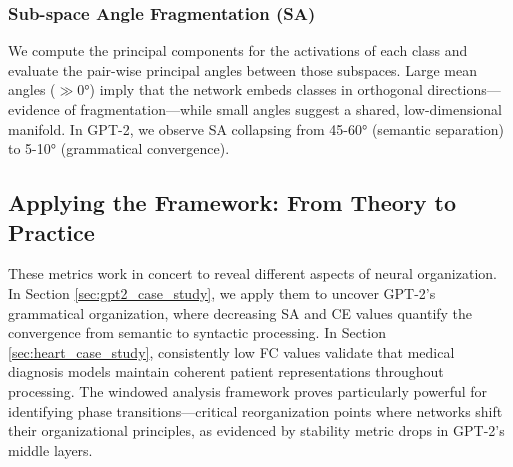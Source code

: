 \subsubsection{Sub-space Angle Fragmentation (SA)}
We compute the principal components for the activations of each class and evaluate the pair-wise principal angles between those subspaces. Large mean angles ($\gg 0°$) imply that the network embeds classes in orthogonal directions—evidence of fragmentation—while small angles suggest a shared, low-dimensional manifold. In GPT-2, we observe SA collapsing from 45-60° (semantic separation) to 5-10° (grammatical convergence).

\subsection{Applying the Framework: From Theory to Practice}

These metrics work in concert to reveal different aspects of neural organization. In Section \ref{sec:gpt2_case_study}, we apply them to uncover GPT-2's grammatical organization, where decreasing SA and CE values quantify the convergence from semantic to syntactic processing. In Section \ref{sec:heart_case_study}, consistently low FC values validate that medical diagnosis models maintain coherent patient representations throughout processing. The windowed analysis framework proves particularly powerful for identifying phase transitions—critical reorganization points where networks shift their organizational principles, as evidenced by stability metric drops in GPT-2's middle layers.

